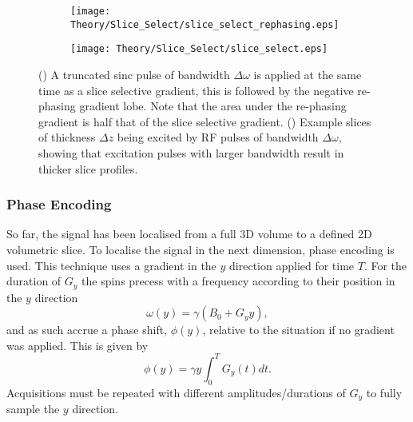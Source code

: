 \begin{figure}[H]
	\centering
	\begin{subfigure}[c]{0.47\textwidth}
		\centering
		\texttt{[image: Theory/Slice\_Select/slice\_select\_rephasing.eps]}
		\caption{}
		\label{fig:theory_slice_select_rephasing}
	\end{subfigure}
	\hfill
	\begin{subfigure}[c]{0.47\textwidth}
		\centering
		\texttt{[image: Theory/Slice\_Select/slice\_select.eps]}
		\caption{}
		\label{fig:theory_slice_select_profile}
	\end{subfigure}
	\caption{() A truncated sinc pulse of bandwidth $\Delta \omega$ is applied at the same time as a slice selective gradient, this is followed by the negative re-phasing gradient lobe. Note that the area under the re-phasing gradient is half that of the slice selective gradient. () Example slices of thickness $\Delta z$ being excited by \ac{RF} pulses of bandwidth $\Delta \omega$, showing that excitation pulses with larger bandwidth result in thicker slice profiles.}
	\label{fig:theory_slice_select}
\end{figure}
\subsubsection{Phase Encoding}
So far, the signal has been localised from a full 3D volume to a defined 2D volumetric slice. To localise the signal in the next dimension, phase encoding is used. This technique uses a gradient in the $y$ direction applied for time $T$. For the duration of $G_y$ the spins precess with a frequency according to their position in the $y$ direction
\begin{equation}
\omega \left( y\right) = \gamma\left( B_0 + G_yy\right),
\end{equation}
and as such accrue a phase shift, $\phi \left( y \right)$, relative to the situation if no gradient was applied. This is given by 
\begin{equation}
\phi\left( y\right)  = \gamma y \int_{0}^{T} G_y\left( t\right) dt.
\end{equation}
Acquisitions must be repeated with different amplitudes/durations of $G_y$ to fully sample the $y$ direction.

